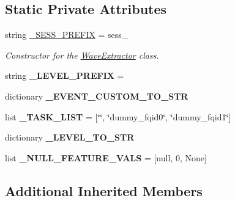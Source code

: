 \subsection*{Static Private Attributes}
\begin{DoxyCompactItemize}
\item 
string \mbox{\hyperlink{classfeature__extractors_1_1_jowilder_extractor_1_1_jowilder_extractor_afb46727e9fb1f21a97b3357477f39775}{\+\_\+\+S\+E\+S\+S\+\_\+\+P\+R\+E\+F\+IX}} = \textquotesingle{}sess\+\_\+\textquotesingle{}
\begin{DoxyCompactList}\small\item\em Constructor for the \mbox{\hyperlink{class_wave_extractor}{Wave\+Extractor}} class. \end{DoxyCompactList}\item 
\mbox{\label{classfeature__extractors_1_1_jowilder_extractor_1_1_jowilder_extractor_a3831d6202880a9b0f97ce1ab1ebd617d}} 
string {\bfseries \+\_\+\+L\+E\+V\+E\+L\+\_\+\+P\+R\+E\+F\+IX} = \textquotesingle{}\textquotesingle{}
\item 
dictionary {\bfseries \+\_\+\+E\+V\+E\+N\+T\+\_\+\+C\+U\+S\+T\+O\+M\+\_\+\+T\+O\+\_\+\+S\+TR}
\item 
\mbox{\label{classfeature__extractors_1_1_jowilder_extractor_1_1_jowilder_extractor_a1244cd8829c6d96e3799422ddd6d45d1}} 
list {\bfseries \+\_\+\+T\+A\+S\+K\+\_\+\+L\+I\+ST} = \mbox{[}\char`\"{}\char`\"{}, \char`\"{}dummy\+\_\+fqid0\char`\"{}, \char`\"{}dummy\+\_\+fqid1\char`\"{}\mbox{]}
\item 
dictionary {\bfseries \+\_\+\+L\+E\+V\+E\+L\+\_\+\+T\+O\+\_\+\+S\+TR}
\item 
\mbox{\label{classfeature__extractors_1_1_jowilder_extractor_1_1_jowilder_extractor_ad5501e556cd14677dd99ea49c95b430d}} 
list {\bfseries \+\_\+\+N\+U\+L\+L\+\_\+\+F\+E\+A\+T\+U\+R\+E\+\_\+\+V\+A\+LS} = \mbox{[}\textquotesingle{}null\textquotesingle{}, 0, None\mbox{]}
\end{DoxyCompactItemize}
\subsection*{Additional Inherited Members}


